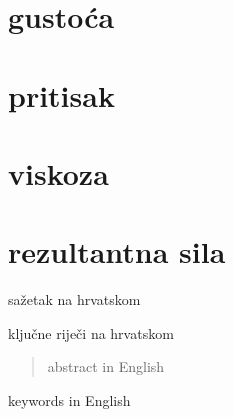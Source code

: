 \documentclass[diplomskirad]{fer}
\begin{document}
    \section{gustoća}\label{sec:gustoca}
    \section{pritisak}\label{sec:pritisak}
    \section{viskoza}\label{sec:viskoza}
    \section{rezultantna sila}\label{sec:rezultantna-sila}


    
    \begin{sazetak}
        sažetak na hrvatskom
    \end{sazetak}
    \begin{kljucnerijeci}
        ključne riječi na hrvatskom
    \end{kljucnerijeci}
    \begin{abstract}
        abstract in English
    \end{abstract}
    \begin{keywords}
        keywords in English
    \end{keywords}
\end{document}
